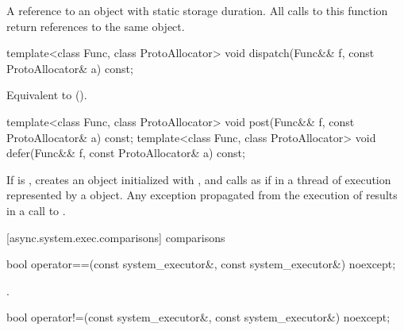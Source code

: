 \begin{itemdescr}
\pnum
\returns A reference to an object with static storage duration. All calls to this function return references to the same object.
\end{itemdescr}

%
\begin{itemdecl}
template<class Func, class ProtoAllocator>
  void dispatch(Func&& f, const ProtoAllocator& a) const;
\end{itemdecl}

\begin{itemdescr}
\pnum
\effects Equivalent to  ().
\end{itemdescr}

%
%
\begin{itemdecl}
template<class Func, class ProtoAllocator>
  void post(Func&& f, const ProtoAllocator& a) const;
template<class Func, class ProtoAllocator>
  void defer(Func&& f, const ProtoAllocator& a) const;
\end{itemdecl}

\begin{itemdescr}
\pnum
\effects If  is ,
creates an object  initialized with ,
and calls  as if in a thread of execution represented by a  object.
Any exception propagated from the execution of 
results in a call to .
\end{itemdescr}



[async.system.exec.comparisons]{ comparisons}

%
\begin{itemdecl}
bool operator==(const system_executor&, const system_executor&) noexcept;
\end{itemdecl}

\begin{itemdescr}
\pnum
\returns {}.
\end{itemdescr}

%
\begin{itemdecl}
bool operator!=(const system_executor&, const system_executor&) noexcept;
\end{itemdecl}

